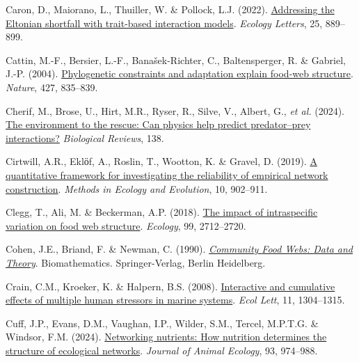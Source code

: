 \documentclass[
]{article}
\newlength{\cslhangindent}
\newenvironment{CSLReferences}[2] %
 {\begin{list}{}{%
  \setlength{\itemindent}{0pt}
  \setlength{\leftmargin}{0pt}
  \setlength{\parsep}{0pt}
  \ifodd #1
   \setlength{\leftmargin}{\cslhangindent}
   \setlength{\itemindent}{-1\cslhangindent}
  \fi
  \setlength{\itemsep}{#2\baselineskip}}}
 {\end{list}}
\begin{document}
\begin{CSLReferences}{1}{0}
Caron, D., Maiorano, L., Thuiller, W. \& Pollock, L.J. (2022).
\href{https://doi.org/10.1111/ele.13966}{Addressing the {Eltonian}
shortfall with trait-based interaction models}. \emph{Ecology Letters},
25, 889--899.

Cattin, M.-F., Bersier, L.-F., Banašek-Richter, C., Baltensperger, R. \&
Gabriel, J.-P. (2004).
\href{https://doi.org/10.1038/nature02327}{Phylogenetic constraints and
adaptation explain food-web structure}. \emph{Nature}, 427, 835--839.

Cherif, M., Brose, U., Hirt, M.R., Ryser, R., Silve, V., Albert, G.,
\emph{et al.} (2024). \href{https://doi.org/10.1111/brv.13105}{The
environment to the rescue: Can physics help predict predator--prey
interactions?} \emph{Biological Reviews}, 138.

Cirtwill, A.R., Eklӧf, A., Roslin, T., Wootton, K. \& Gravel, D. (2019).
\href{https://doi.org/10.1111/2041-210X.13180}{A quantitative framework
for investigating the reliability of empirical network construction}.
\emph{Methods in Ecology and Evolution}, 10, 902--911.

Clegg, T., Ali, M. \& Beckerman, A.P. (2018).
\href{https://doi.org/10.1002/ecy.2523}{The impact of intraspecific
variation on food web structure}. \emph{Ecology}, 99, 2712--2720.

Cohen, J.E., Briand, F. \& Newman, C. (1990).
\emph{\href{https://www.springer.com/gp/book/9783642837869}{Community
{Food Webs}: {Data} and {Theory}}}. Biomathematics. Springer-Verlag,
Berlin Heidelberg.

Crain, C.M., Kroeker, K. \& Halpern, B.S. (2008).
\href{https://doi.org/10.1111/j.1461-0248.2008.01253.x}{Interactive and
cumulative effects of multiple human stressors in marine systems}.
\emph{Ecol Lett}, 11, 1304--1315.

Cuff, J.P., Evans, D.M., Vaughan, I.P., Wilder, S.M., Tercel, M.P.T.G.
\& Windsor, F.M. (2024).
\href{https://doi.org/10.1111/1365-2656.14124}{Networking nutrients:
{How} nutrition determines the structure of ecological networks}.
\emph{Journal of Animal Ecology}, 93, 974--988.


\end{CSLReferences}
\end{document}
